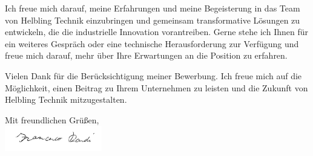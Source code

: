 \documentclass[11pt,a4paper,sans,expansion=false]{moderncv}
\begin{document}
Ich freue mich darauf, meine Erfahrungen und meine Begeisterung in das Team von Helbling Technik einzubringen und gemeinsam transformative Lösungen zu entwickeln, die die industrielle Innovation vorantreiben. Gerne stehe ich Ihnen für ein weiteres Gespräch oder eine technische Herausforderung zur Verfügung und freue mich darauf, mehr über Ihre Erwartungen an die Position zu erfahren.

Vielen Dank für die Berücksichtigung meiner Bewerbung. Ich freue mich auf die Möglichkeit, einen Beitrag zu Ihrem Unternehmen zu leisten und die Zukunft von Helbling Technik mitzugestalten.

\closing{Mit freundlichen Grüßen, \\ \vspace{2em} \includegraphics[height=3em]{../firma_estesa.jpg}
\vspace{-7em}}
\makeletterclosing
\end{document}
